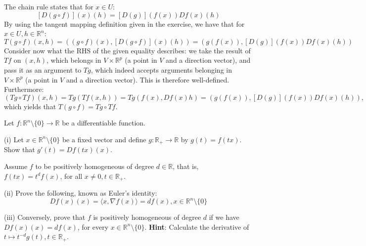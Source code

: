 \begin{solution}

    The chain rule states that for $x \in U$:
    $$[D(g \circ f)](x)(h) = [D(g)](f(x))Df(x)(h)$$
    By using the tangent mapping definition given in the exercise, we have that for $x \in U, h \in \mathbb{R}^n$:
    $$T(g \circ f)(x, h) = ((g \circ f)(x), [D(g \circ f)](x)(h)) = (g(f(x)), [D(g)](f(x))Df(x)(h))$$
    Consider now what the RHS of the given equality describes: we take the result of $Tf$ on $(x, h)$, which belongs in $V \times \mathbb{R}^p$ (a point in $V$ and a direction vector), and pass it as an argument to $Tg$, which indeed accepts arguments belonging in $V \times \mathbb{R}^p$ (a point in $V$ and a direction vector).
    This is therefore well-defined.
    Furthermore:
    $$(Tg \circ Tf)(x, h) = Tg(Tf(x, h)) = Tg(f(x), Df(x)h) = (g(f(x)), [D(g)](f(x))Df(x)(h)),$$
    which yields that $T(g \circ f) = Tg \circ Tf$.
\end{solution}

\begin{exercise}{32}
    Let $f: \mathbb{R}^n \setminus \{0\} \rightarrow \mathbb{R}$ be a differentiable function.

    (i) Let $x \in \mathbb{R}^n \setminus \{0\}$ be a fixed vector and define $g: \mathbb{R}_{+} \rightarrow \mathbb{R}$ by $g(t) = f(tx)$.
    Show that $g'(t) = D f(tx)(x)$.

    Assume $f$ to be positively homogeneous of degree $d \in \mathbb{R}$, that is, $f(tx) = t^df(x)$, for all $x \neq 0, t \in \mathbb{R}_{+}$.

    (ii) Prove the following, known as Euler's identity:
    $$Df(x)(x) = \langle x, \nabla f(x) \rangle = d f(x), x \in \mathbb{R}^n \setminus \{0\}$$

    (iii) Conversely, prove that $f$ is positively homogeneous of degree $d$ if we have $Df(x)(x) = df(x)$, for every $x \in \mathbb{R}^n \setminus \{0\}$. \textbf{Hint}: Calculate the derivative of $t \mapsto t^{-d}g(t), t \in \mathbb{R}_{+}$.
\end{exercise}

